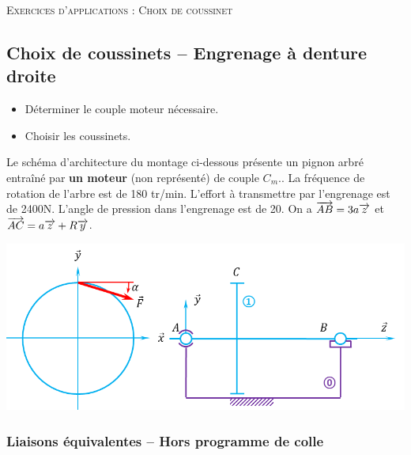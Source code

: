 \documentclass[10pt]{article}
\begin{document}

\begin{center}
\Large{\textsc{Exercices d'applications : Choix de coussinet}}
\end{center}

\vspace{.25cm}
%
%

\subsection*{Choix de coussinets -- Engrenage à denture droite}

\begin{obj}
\begin{itemize}
\item Déterminer le couple moteur nécessaire.
\item Choisir les coussinets.
\end{itemize}
\end{obj}


Le schéma d'architecture du montage ci-dessous présente un pignon arbré entraîné par \textbf{un moteur} (non représenté) de couple $C_m$.. La fréquence de rotation de l'arbre est de 180 tr/min.
L'effort à transmettre par l'engrenage est de 2400N. L'angle de pression dans l'engrenage est de 20\textdegree. On a $\overrightarrow{AB} = 3a \overrightarrow{z}$ et $\overrightarrow{AC} = a\overrightarrow{z}  + R \overrightarrow{y}$.

\begin{center}
\includegraphics[width=.7\textwidth]{images/modele}
\end{center}

\subsubsection*{Liaisons équivalentes -- Hors programme de colle}
\end{document}
